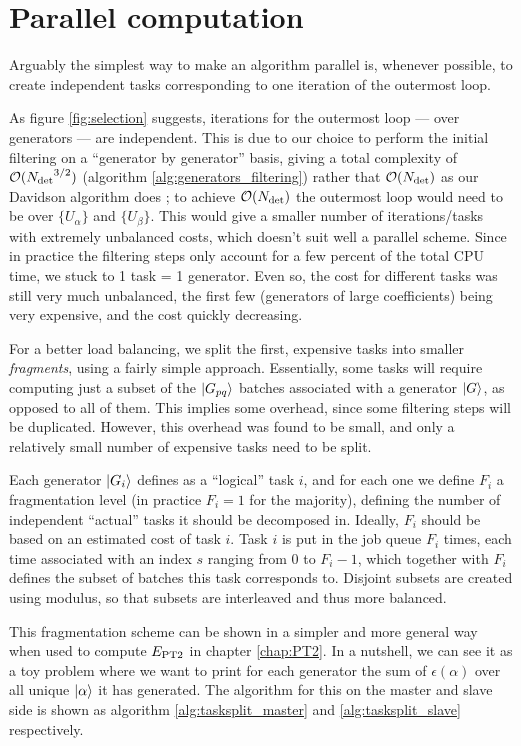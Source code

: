 \documentclass[./thesis.tex]{subfiles}
\begin{document}
\section{Parallel computation}

Arguably the simplest way to make an algorithm parallel is, whenever possible, to create independent tasks corresponding to one iteration of the outermost loop. 

As figure \ref{fig:selection} suggests, iterations for the outermost loop --- over generators --- are independent. This is due to our choice to perform the initial filtering on a ``generator by generator'' basis, giving a total complexity of $\mathcal{O}({N_\text{det}}^{3/2})$ (algorithm \ref{alg:generators_filtering}) rather that $\mathcal{O}({N_\text{det}})$ as our Davidson algorithm does ; to achieve $\mathcal{O}({N_\text{det}})$ the outermost loop would need to be over $\{U_\alpha\}$ and $\{U_\beta\}$. This would give a smaller number of iterations/tasks with extremely unbalanced costs, which doesn't suit well a parallel scheme. Since in practice the filtering steps only account for a few percent of the total CPU time, we stuck to 1 task = 1 generator. Even so, the cost for different tasks was still very much unbalanced, the first few (generators of large coefficients) being very expensive, and the cost quickly decreasing.

For a better load balancing, we split the first, expensive tasks into smaller \emph{fragments}, using a fairly simple approach. Essentially, some tasks will require computing just a subset of the $\ket {G_{pq}}$ batches associated with a generator $\ket G$, as opposed to all of them. This implies some overhead, since some filtering steps will be duplicated. However, this overhead was found to be small, and only a relatively small number of expensive tasks need to be split.

Each generator $\ket {G_i}$ defines as a ``logical'' task $i$, and for each one we define $F_i$ a fragmentation level (in practice $F_i = 1$ for the majority), defining the number of independent ``actual'' tasks it should be decomposed in. Ideally, $F_i$ should be based on an estimated cost of task $i$. 
Task $i$ is put in the job queue $F_i$ times, each time associated with an index $s$ ranging from $0$ to $F_i-1$, which together with $F_i$ defines the subset of batches this task corresponds to. Disjoint subsets are created using modulus, so that subsets are interleaved and thus more balanced.
 
This fragmentation scheme can be shown in a simpler and more general way when used to compute $E_\text{PT2}$ in chapter \ref{chap:PT2}. In a nutshell, we can see it as a toy problem where we want to print for each generator the sum of $\epsilon(\alpha)$ over all unique ${\ket{\alpha}}$ it has generated. The algorithm for this on the master and slave side is shown as algorithm \ref{alg:tasksplit_master} and \ref{alg:tasksplit_slave} respectively.
\end{document}
